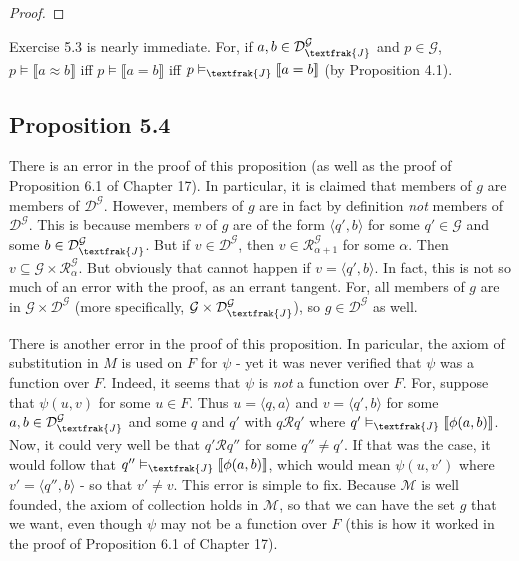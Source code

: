 \documentclass{article}
\newcommand{\lbc}{\llbracket}
\newcommand{\rbc}{\rrbracket}
\theoremstyle{definition}
\begin{document}
\begin{proof}
\end{proof}

Exercise 5.3 is nearly immediate.
For, if $a,b\in\mathcal{D}^\mathcal{G}_\textfrak{J}$ and $p\in\mathcal{G}$,
$p\vDash\lbc a\approx b\rbc$ iff $p\vDash\lbc a=b\rbc$ iff
$p\vDash_\textfrak{J}\lbc a=b\rbc$ (by Proposition 4.1).

\subsection*{Proposition 5.4}
There is an error in the proof of this proposition (as well as the proof of Proposition 6.1 of Chapter 17). 
In particular, it is claimed that members of $g$ are 
 members of $\mathcal{D}^\mathcal{G}$. However, members of $g$ are in fact 
by definition \textit{not} members of $\mathcal{D}^\mathcal{G}$. This is because members $v$ 
of $g$ are of the form $\langle q',b\rangle$ for some $q'\in\mathcal{G}$ and some 
$b\in\mathcal{D}^\mathcal{G}_\textfrak{J}$. But if $v\in\mathcal{D}^\mathcal{G}$, then 
$v\in\mathcal{R}^\mathcal{G}_{\alpha+1}$ for some $\alpha$. Then
$v\subseteq\mathcal{G}\times\mathcal{R}^\mathcal{G}_\alpha$. But obviously that cannot happen if 
$v=\langle q',b\rangle$. In fact, this is not so much of an error with the proof, as an errant tangent. For, all 
members of $g$ are in $\mathcal{G}\times\mathcal{D}^\mathcal{G}$ (more specifically,
$\mathcal{G}\times\mathcal{D}^\mathcal{G}_\textfrak{J}$), so $g\in\mathcal{D}^\mathcal{G}$ as well.

There is another error in the proof of this proposition. In paricular, the axiom 
of substitution in $M$ is used on $F$ for $\psi$ - yet it was never verified that $\psi$ was a function over $F$. Indeed, it 
seems that $\psi$ is \textit{not} a function over $F$. For, suppose that $\psi(u,v)$ for some 
$u\in F$. Thus $u=\langle q,a\rangle$ and $v=\langle q',b\rangle$ for some $a,b\in\mathcal{D}^\mathcal{G}_\textfrak{J}$ and 
some $q$ and $q'$ with $q\mathcal{R}q'$ where $q'\vDash_\textfrak{J}\lbc\phi(a,b)\rbc$. 
Now, it could very well be that $q'\mathcal{R}q''$ for some $q''\ne q'$. If that was the case, 
it would follow that $q''\vDash_\textfrak{J}\lbc\phi(a,b)\rbc$, which would mean $\psi(u,v')$ where 
$v'=\langle q'',b\rangle$ - so that $v'\ne v$. This error is simple to fix. Because $\mathcal{M}$ is 
well founded, the axiom of collection holds in $\mathcal{M}$, so that we can have the set $g$ that we 
want, even though $\psi$ may not be a function over $F$ (this is how it worked in the proof of Proposition 6.1 of Chapter 17).
\end{document}

